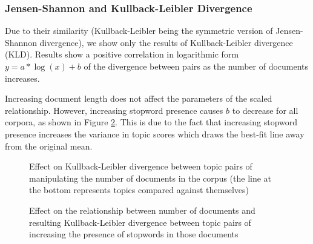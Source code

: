 \documentclass[letterpaper, 10 pt, conference]{ieeeconf}  %
\begin{document}
\subsubsection{Jensen-Shannon and Kullback-Leibler Divergence}
Due to their similarity (Kullback-Leibler being the symmetric version of Jensen-Shannon divergence), we show only the results of Kullback-Leibler divergence (KLD). Results show a positive correlation in logarithmic form $y=a*\log(x)+b$ of the divergence between pairs as the number of documents increases.

Increasing document length does not affect the parameters of the scaled relationship. However, increasing stopword presence causes $b$ to decrease for all corpora, as shown in Figure \ref{fig:nd_kld_sw}. This is due to the fact that increasing stopword presence increases the variance in topic scores which draws the best-fit line away from the original mean.

      \begin{figure}[thpb]
      \centering
      \caption{Effect on Kullback-Leibler divergence between topic pairs of manipulating the number of documents in the corpus (the line at the bottom represents topics compared against themselves)}
      \label{fig:nd_kld}
   \end{figure}
   
         \begin{figure}[thpb]
      \centering
      \caption{Effect on the relationship between number of documents and resulting Kullback-Leibler divergence between topic pairs of increasing the presence of stopwords in those documents}
      \label{fig:nd_kld_sw}
   \end{figure}
\end{document}
